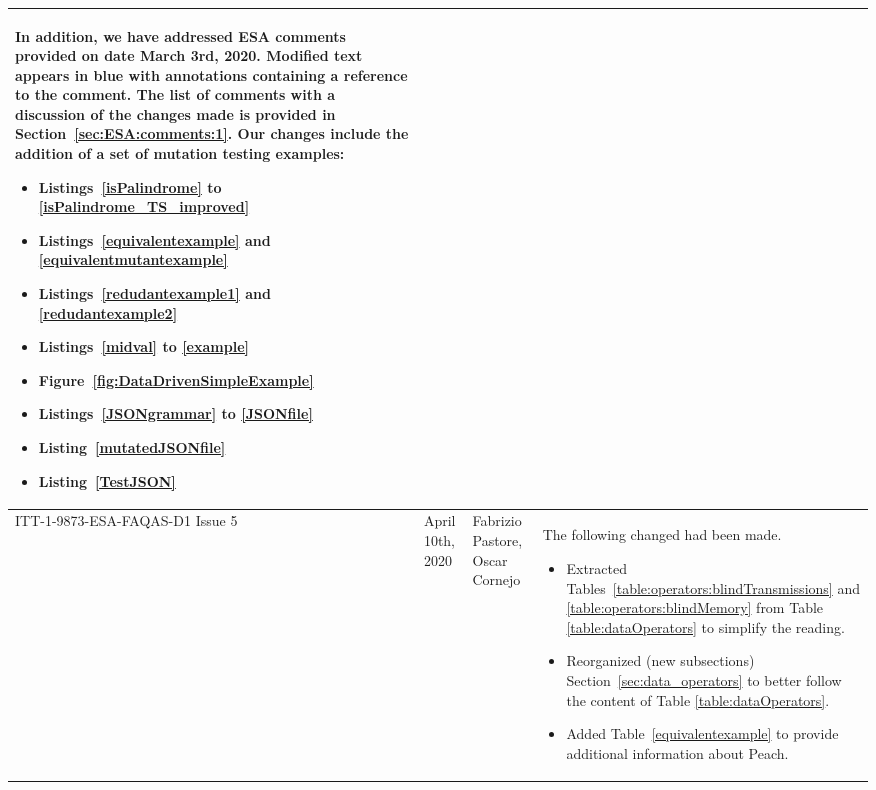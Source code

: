 \begin{longtable}{|p{2cm}|p{1cm}|p{1.5cm}|p{9cm}|@{}}
\begin{minipage}{8cm}
In addition, we have addressed ESA comments provided on date March 3rd, 2020. Modified text appears in blue with annotations containing a reference to the comment. The list of comments with a discussion of the changes made is provided in Section~\ref{sec:ESA:comments:1}. Our changes include the addition of a set of mutation testing examples:
\begin{itemize}
	\item Listings~\ref{isPalindrome} to \ref{isPalindrome_TS_improved}
	\item Listings~\ref{equivalentexample} and \ref{equivalentmutantexample}
	\item Listings~\ref{redudantexample1} and \ref{redudantexample2}	
	\item Listings~\ref{midval} to \ref{example}
	\item Figure~\ref{fig:DataDrivenSimpleExample}
	\item Listings~\ref{JSONgrammar} to \ref{JSONfile}
	\item Listing~\ref{mutatedJSONfile}
	\item Listing~\ref{TestJSON}
\end{itemize}

\end{minipage}

\\
\hline
ITT-1-9873-ESA-FAQAS-D1
Issue 5
&April 10th, 2020
&Fabrizio Pastore, Oscar Cornejo
&
\begin{minipage}{8cm}

The following changed had been made. 
\begin{itemize}
	\item Extracted Tables~\ref{table:operators:blindTransmissions} and \ref{table:operators:blindMemory} from Table \ref{table:dataOperators} to simplify the reading.
	\item Reorganized (new subsections) Section~\ref{sec:data_operators} to better follow the content of Table \ref{table:dataOperators}.
	\item Added Table~\ref{equivalentexample} to provide additional information about Peach.
\end{itemize}

\end{minipage}
\\



\end{longtable}
